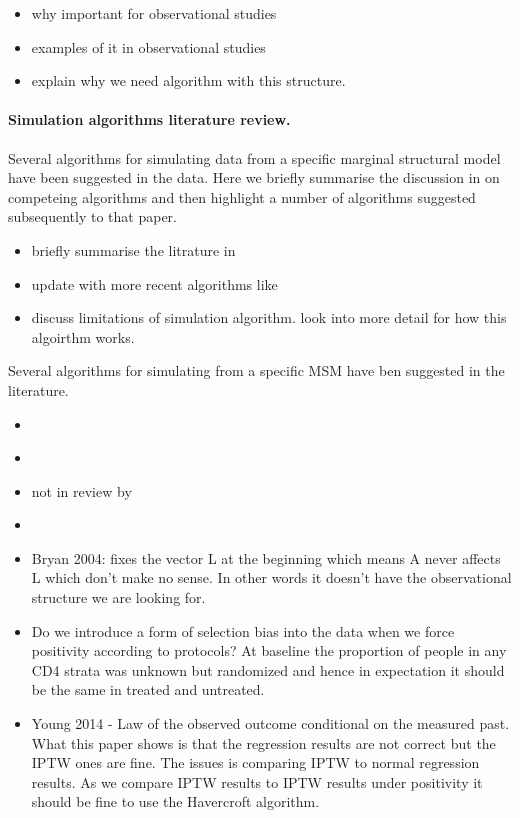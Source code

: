 \documentclass[11pt]{article}
\providecommand{\tightlist}{%
      \setlength{\itemsep}{0pt}\setlength{\parskip}{0pt}}
\begin{document}
\begin{itemize}
\tightlist
\item
  why important for observational studies
\item
  examples of it in observational studies
\item
  explain why we need algorithm with this structure.
\end{itemize}

    \paragraph{Simulation algorithms literature
review.}\label{simulation-algorithms-literature-review.}

Several algorithms for simulating data from a specific marginal
structural model have been suggested in the data. Here we briefly
summarise the discussion in \citet{Havercroft2012} on competeing
algorithms and then highlight a number of algorithms suggested
subsequently to that paper.

\begin{itemize}
\tightlist
\item
  briefly summarise the litrature in \citet{Havercroft2012}
\item
  update with more recent algorithms like \citet{Young2014}
\item
  discuss \citet{Naimi2011} limitations of simulation algorithm. look
  into more detail for how this algoirthm works.
\end{itemize}

Several algorithms for simulating from a specific MSM have ben suggested
in the literature.

\begin{itemize}
\item
  \citet{Havercroft2012}
\item
  \citet{Bryan2004}
\item
  \citet{Westreich2012} not in review by \citet{Havercroft2012}
\item
  \citet{Young2014}
\item
  Bryan 2004: fixes the vector L at the beginning which means A never
  affects L which don't make no sense. In other words it doesn't have
  the observational structure we are looking for.
\item
  Do we introduce a form of selection bias into the data when we force
  positivity according to protocols? At baseline the proportion of
  people in any CD4 strata was unknown but randomized and hence in
  expectation it should be the same in treated and untreated.
\item
  Young 2014 - Law of the observed outcome conditional on the measured
  past. What this paper shows is that the regression results are not
  correct but the IPTW ones are fine. The issues is comparing IPTW to
  normal regression results. As we compare IPTW results to IPTW results
  under positivity it should be fine to use the Havercroft algorithm.
\end{itemize}
\end{document}
